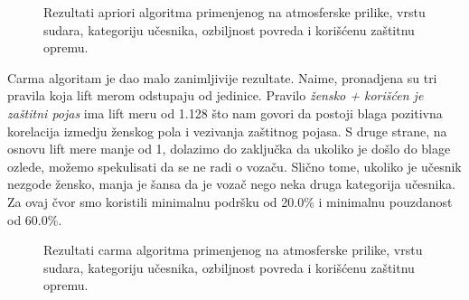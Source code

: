 \documentclass[a4paper,10pt]{article}
\begin{document}
\begin{figure}[h!]
 \centering
 \caption{Rezultati apriori algoritma primenjenog na atmosferske prilike, vrstu sudara, kategoriju učesnika, ozbiljnost povreda
i korišćenu zaštitnu opremu. }
\end{figure}

Carma algoritam je dao malo zanimljivije rezultate. Naime, pronadjena su tri pravila koja lift merom odstupaju od jedinice. Pravilo
\textit{žensko + korišćen je zaštitni pojas} ima lift meru od 1.128 što nam govori da postoji blaga pozitivna korelacija
izmedju ženskog pola i vezivanja zaštitnog pojasa. S druge strane, na osnovu lift mere manje od 1, dolazimo do zaključka
da ukoliko je došlo do blage ozlede, možemo spekulisati da se ne radi o vozaču. Slično tome, ukoliko je učesnik nezgode 
žensko, manja je šansa da je vozač nego neka druga kategorija učesnika. Za ovaj čvor smo koristili minimalnu podršku od 20.0\% i
minimalnu pouzdanost od 60.0\%. \\

\begin{figure}[h!]
 \centering
 \caption{Rezultati carma algoritma primenjenog na atmosferske prilike, vrstu sudara, kategoriju učesnika, ozbiljnost povreda
i korišćenu zaštitnu opremu. }
\end{figure} 
\end{document}
